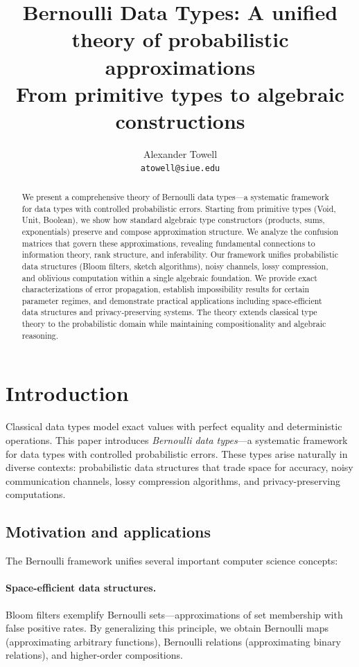 \documentclass[11pt,final,hidelinks]{article}
\title
{
    Bernoulli Data Types: A unified theory of probabilistic approximations\\
    \large From primitive types to algebraic constructions
}
\author
{
    Alexander Towell\\
    \texttt{atowell@siue.edu}
}
\date{}
\theoremstyle{plain}
\begin{document}
\maketitle
\begin{abstract}
We present a comprehensive theory of Bernoulli data types---a systematic framework for data types with controlled probabilistic errors.
Starting from primitive types (Void, Unit, Boolean), we show how standard algebraic type constructors (products, sums, exponentials) preserve and compose approximation structure.
We analyze the confusion matrices that govern these approximations, revealing fundamental connections to information theory, rank structure, and inferability.
Our framework unifies probabilistic data structures (Bloom filters, sketch algorithms), noisy channels, lossy compression, and oblivious computation within a single algebraic foundation.
We provide exact characterizations of error propagation, establish impossibility results for certain parameter regimes, and demonstrate practical applications including space-efficient data structures and privacy-preserving systems.
The theory extends classical type theory to the probabilistic domain while maintaining compositionality and algebraic reasoning.
\end{abstract}

\tableofcontents

\section{Introduction}
\label{sec:introduction}

Classical data types model exact values with perfect equality and deterministic operations. This paper introduces \emph{Bernoulli data types}---a systematic framework for data types with controlled probabilistic errors. These types arise naturally in diverse contexts: probabilistic data structures that trade space for accuracy, noisy communication channels, lossy compression algorithms, and privacy-preserving computations.

\subsection{Motivation and applications}

The Bernoulli framework unifies several important computer science concepts:

\paragraph{Space-efficient data structures.} Bloom filters exemplify Bernoulli sets---approximations of set membership with false positive rates. By generalizing this principle, we obtain Bernoulli maps (approximating arbitrary functions), Bernoulli relations (approximating binary relations), and higher-order compositions.
\end{document}
